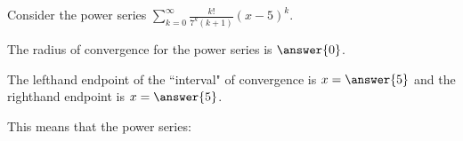 \documentclass{ximera}
\author{Jim Talamo}
\begin{document}
\begin{exercise}
Consider the power series $\sum_{k=0}^{\infty} \frac{k!}{7^k (k+1)}(x-5)^k$.

The radius of convergence for the power series is $\answer{0}$.

The lefthand endpoint of the ``interval" of convergence is $x=\answer{5}$ and the righthand endpoint is $x= \answer{5}$.  

This means that the power series:

\begin{multipleChoice}
\end{multipleChoice}


\end{exercise}
\end{document}
